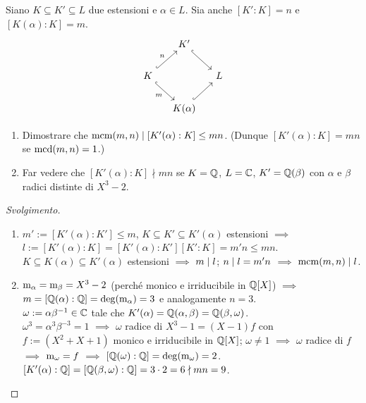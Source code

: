 \begin{eser}
Siano \(K \subseteq K' \subseteq L\) due estensioni e \(\alpha \in L\). Sia anche \([K':K]=n\) e \([K(\alpha):K]=m\).
\[\begin{tikzcd}[column sep=small]
& K' \ar[dr, hookrightarrow] \\
K \ar["n", ur, hookrightarrow] \ar["m", hookrightarrow, dr, swap] & & L \\
& K(\alpha) \ar[ur, hookrightarrow]
\end{tikzcd}\]
\begin{enumerate}
\item Dimostrare che \(\operatorname{mcm}(m,n) \mid [K'(\alpha):K] \le mn\). (Dunque \([K'(\alpha):K]=mn\) se \(\operatorname{mcd}(m,n)=1\).)
\item Far vedere che \([K'(\alpha):K] \nmid mn\) se \(K=\mathbb{Q}\), \(L=\mathbb{C}\), \(K'=\mathbb{Q}(\beta)\) con \(\alpha\) e \(\beta\) radici distinte di \(X^3-2\).
\end{enumerate}
\end{eser}

\begin{proof}[Svolgimento]
\begin{enumerate}
\item \(m':=[K'(\alpha):K']\le m\), \(K\subseteq K'\subseteq K'(\alpha)\) estensioni \(\implies\) \(l:=[K'(\alpha):K]=[K'(\alpha):K'][K':K]=m'n\le mn\). \(K\subseteq K(\alpha)\subseteq K'(\alpha)\) estensioni \(\implies\) \(m\mid l\); \(n\mid l=m'n\) \(\implies\) \(\operatorname{mcm}(m,n)\mid l\). 
\item \(\mathrm{m}_{\alpha}=\mathrm{m}_{\beta}=X^3-2\) (perché monico e irriducibile in \(\mathbb{Q}[X]\)) \(\implies\) \(m=[\mathbb{Q}(\alpha):\mathbb{Q}]=\deg(\mathrm{m}_{\alpha})=3\) e analogamente \(n=3\). \\
\(\omega:=\alpha\beta^{-1}\in\mathbb{C}\) tale che \(K'(\alpha)=\mathbb{Q}(\alpha,\beta)=\mathbb{Q}(\beta,\omega)\).\\
\(\omega^3=\alpha^3\beta^{-3}=1\) \(\implies\) \(\omega\) radice di \(X^3-1=(X-1)f\) con \(f:=(X^2+X+1)\) monico e irriducibile in \(\mathbb{Q}[X]\); \(\omega\ne1\) \(\implies\) \(\omega\) radice di \(f\) \(\implies\) \(\mathrm{m}_{\omega}=f\) \(\implies\) \([\mathbb{Q}(\omega):\mathbb{Q}]=\deg(\mathrm{m}_{\omega})=2\). \\
\([K'(\alpha):\mathbb{Q}]=[\mathbb{Q}(\beta,\omega):\mathbb{Q}]=3\cdot2=6\nmid mn=9\). \qedhere
\end{enumerate}
\end{proof}


